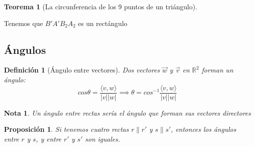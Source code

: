 \documentclass[11pt, a4paper]{article}
\makeatletter
\newif\IfInSansMode
\let\oldsf\sffamily
\renewcommand*{\sffamily}{\oldsf\mathversion{sans}\InSansModetrue}
\let\oldnorm\normalfont
\renewcommand*{\normalfont}{\oldnorm\InSansModefalse\mathversion{normal}}
\renewenvironment{proof}[1][\proofname] {\vspace{-15pt}\par\pushQED{\qed}\normalfont\topsep6\p@\@plus6\p@\relax\trivlist\item[\hskip\labelsep\it#1\@addpunct{.}]\ignorespaces}{\popQED\endtrivlist\@endpefalse}
\newcommand{\R}{\mathbb{R}}
\renewcommand{\vec}{\overrightarrow}
\renewenvironment{proof}[1][\proofname] {\par\pushQED{\qed}\normalfont\topsep6\p@\@plus6\p@\relax\trivlist\item[\hskip\labelsep\itshape\sffamily#1\@addpunct{.}]\ignorespaces}{\popQED\endtrivlist\@endpefalse}
\theoremstyle{theorem-style}
\newtheorem{nth}{Teorema}[section]
\newtheorem{nprop}{Proposición}[section]
\theoremstyle{definition-style}
\newtheorem{ndef}{Definición}[section]
\theoremstyle{remark-style}
\newtheorem*{nota}{Nota}
\theoremstyle{example-style}
\makeatother
\begin{document}
\begin{nth}[La circunferencia de los 9 puntos de un triángulo]
\begin{center}

  \end{center}
   
\end{nth}
\begin{proof}
  Tenemos que $B'A'B_2A_2$ es un rectángulo
\end{proof}



\subsection{Ángulos}

\begin{ndef}[Ángulo entre vectores]
  Dos vectores $\vec{w}$ y $\vec{v}$ en $\R^2$ forman un ángulo:
  \[
    cos \theta =  \frac{\langle  v,w \rangle }{|v||w|} \implies \theta = cos^{-1} \frac{\langle  v,w \rangle }{|v||w|}
  \]
\end{ndef} 
\begin{nota}
  Un ángulo entre rectas sería el ángulo que forman sus vectores directores
\end{nota}
\begin{nprop}
  Si tenemos cuatro rectas $r \parallel r'$ y $s \parallel s'$, entonces los ángulos entre $r$ y $s$, y entre $r'$ y $s'$ son iguales.
\end{nprop}
\end{document}
